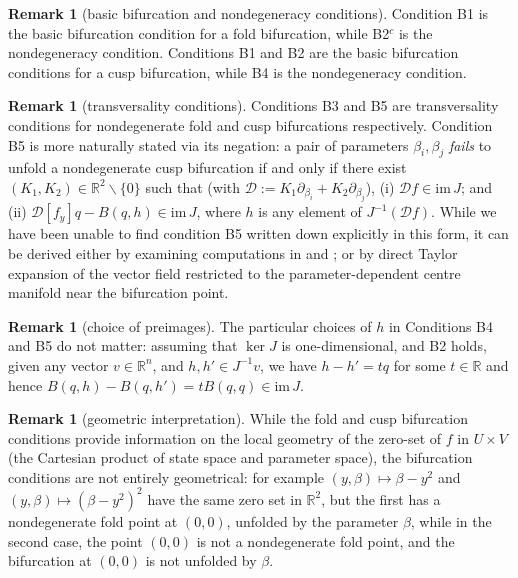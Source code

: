 \documentclass[11pt]{amsart}
\newcommand{\R}{\mathbb{R}}
\newcommand{\mD}{\mathcal{D}}
\theoremstyle{definition}
\newtheorem{remark}[theorem]{Remark}
\begin{document}
\begin{remark}[basic bifurcation and nondegeneracy conditions]
Condition B1 is the basic bifurcation condition for a fold bifurcation, while B2${}^c$ is the nondegeneracy condition. Conditions B1 and B2 are the basic bifurcation conditions for a cusp bifurcation, while B4 is the nondegeneracy condition. 
\end{remark}

\begin{remark}[transversality conditions]
Conditions B3 and B5 are transversality conditions for nondegenerate fold and cusp bifurcations respectively. Condition B5 is more naturally stated via its negation: a pair of parameters $\beta_i, \beta_j$ {\em fails} to unfold a nondegenerate cusp bifurcation if and only if there exist $(K_1, K_2) \in \R^2\backslash\{0\}$ such that (with $\mD := K_1 \partial_{\beta_i} + K_2\partial_{\beta_j}$), (i) $\mD f \in \mathrm{im}\,J$; and (ii) $\mD[f_y]q - B(q,h) \in \mathrm{im}\,J$, where $h$ is any element of $J^{-1}(\mD f)$. While we have been unable to find condition B5 written down explicitly in this form, it can be derived either by examining computations in \cite{kuznetsov:2023} and \cite{golubitsky1985}; or by direct Taylor expansion of the vector field restricted to the parameter-dependent centre manifold near the bifurcation point.
\end{remark}

\begin{remark}[choice of preimages]
The particular choices of $h$ in Conditions B4 and B5 do not matter: assuming that $\ker J$ is one-dimensional, and B2 holds, given any vector $v \in \R^n$, and $h,h' \in J^{-1}v$, we have $h-h' = tq$ for some $t \in \R$ and hence $B(q,h) - B(q,h') = tB(q,q)\in \mathrm{im}\,J$. 
\end{remark}

\begin{remark}[geometric interpretation]
While the fold and cusp bifurcation conditions provide information on the local geometry of the zero-set of $f$ in $U \times V$ (the Cartesian product of state space and parameter space), the bifurcation conditions are not entirely geometrical: for example $(y,\beta) \mapsto \beta - y^2$ and $(y, \beta) \mapsto (\beta - y^2)^2$ have the same zero set in $\R^2$, but the first has a nondegenerate fold point at $(0,0)$, unfolded by the parameter $\beta$, while in the second case, the point $(0,0)$ is not a nondegenerate fold point, and the bifurcation at $(0,0)$ is not unfolded by $\beta$.
\end{remark}
\end{document}

